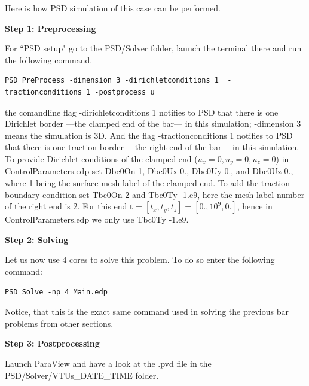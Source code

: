 Here is how PSD simulation of this case can be performed.

\textbf{Step 1: Preprocessing}

For ``PSD setup" go to the {\ttfamily PSD/Solver} folder, launch the terminal there and run the following command.
\begin{lstlisting}[style=Linux]
PSD_PreProcess -dimension 3 -dirichletconditions 1  -tractionconditions 1 -postprocess u
\end{lstlisting}
%
the comandline flag {\ttfamily -dirichletconditions 1} notifies to PSD that there is one Dirichlet border ---the clamped end of the bar--- in this simulation; {\ttfamily -dimension 3} means the simulation is 3D. And the flag {\ttfamily -tractionconditions 1} notifies to PSD that there is one traction border ---the right end of the bar--- in this simulation. 
To provide Dirichlet conditions of the  clamped end ($u_x=0,u_y=0,u_z=0$) in {\ttfamily ControlParameters.edp} set {\ttfamily Dbc0On 1}, {\ttfamily Dbc0Ux 0.}, {\ttfamily Dbc0Uy 0.}, and {\ttfamily Dbc0Uz 0.}, where 1 being the surface mesh label of the clamped end. To add the traction boundary condition set  {\ttfamily Tbc0On 2} and {\ttfamily Tbc0Ty -1.e9}, here the mesh label number of the right end is 2. For this end $\mathbf t=[t_x,t_y,t_z]=[0.,10^9,0.]$, hence in {\ttfamily ControlParameters.edp} we only  use {\ttfamily Tbc0Ty -1.e9}. 


\textbf{Step 2: Solving}

Let us now use 4 cores to solve this problem. To do so enter the following command:

\begin{lstlisting}[style=Linux]
PSD_Solve -np 4 Main.edp
\end{lstlisting}
%
Notice, that this is the exact same command used in solving the previous bar problems from other sections.


\textbf{Step 3: Postprocessing}

Launch ParaView and have a look at the  {\ttfamily .pvd} file in the  {\ttfamily PSD/Solver/VTUs\_DATE\_TIME} folder. 

